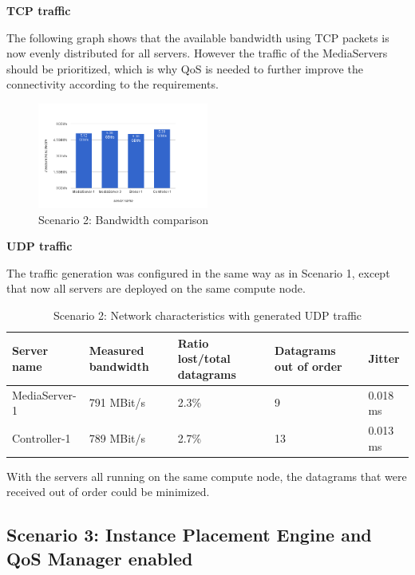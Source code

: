 \textbf{TCP traffic}

The following graph shows that the available bandwidth using TCP packets is now evenly distributed for all servers. However the traffic of the MediaServers should be prioritized, which is why QoS is needed to further improve the connectivity according to the requirements.

\begin{figure}[H]
\centering

\includegraphics[width=0.5\textwidth]{images/evaluation/testbed_scenario2_bw}

\caption{Scenario 2: Bandwidth comparison}
\end{figure}

\textbf{UDP traffic}

The traffic generation was configured in the same way as in Scenario 1, except that now all servers are deployed on the same compute node.

\begin{table}[H]
\centering

\begin{tabularx}{\textwidth}{ |X|X|X|X|X| }
\hline Server name & Measured bandwidth & Ratio lost/total datagrams & Datagrams out of order & Jitter \\ 
\hline MediaServer-1 & 791 MBit/s & 2.3\% & 9 & 0.018 ms\\ 
\hline Controller-1 & 789 MBit/s & 2.7\% & 13 & 0.013 ms \\ 
\hline 
\end{tabularx}

\caption{Scenario 2: Network characteristics with generated UDP traffic}
\end{table}

With the servers all running on the same compute node, the datagrams that were received out of order could be minimized.

\subsection{Scenario 3: Instance Placement Engine and QoS Manager enabled}

